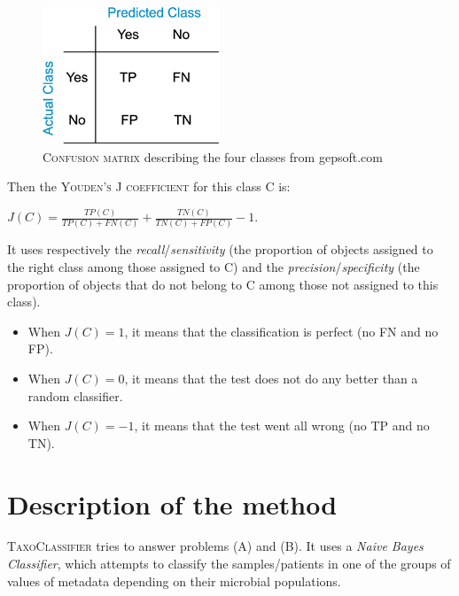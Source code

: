 \documentclass{report}
\begin{document}
\begin{figure}[H]
\centering
\includegraphics[scale=0.5]{illustrations/confusionmatrix.png}
\caption{\textsc{Confusion matrix} describing the four classes from gepsoft.com}
\end{figure}

Then the \textsc{Youden's J coefficient} for this class \textsc{C} is:\\

\begin{center}
$J(C) = \frac{TP(C)}{TP(C) + FN(C)} + \frac{TN(C)}{TN(C) + FP(C)} - 1$.\\
\end{center}

It uses respectively the \emph{recall}/\emph{sensitivity}\cite{F-measure} (the proportion of objects assigned to the right class among those assigned to \textsc{C}) and the \emph{precision}/\emph{specificity}\cite{F-measure} (the proportion of objects that do not belong to \textsc{C} among those not assigned to this class).\\

\begin{itemize}
\item When $J(C) = 1$, it means that the classification is perfect (no \textsc{FN} and no \textsc{FP}).
\item When $J(C) = 0$, it means that the test does not do any better than a random classifier.
\item When $J(C) = -1$, it means that the test went all wrong (no \textsc{TP} and no \textsc{TN}).
\end{itemize}

\section{Description of the method}

\textsc{TaxoClassifier} tries to answer problems (\textsc{A}) and (\textsc{B}). It uses a \emph{Naive Bayes Classifier}, which attempts to classify the samples/patients in one of the groups of values of metadata depending on their microbial populations.\\
\end{document}
